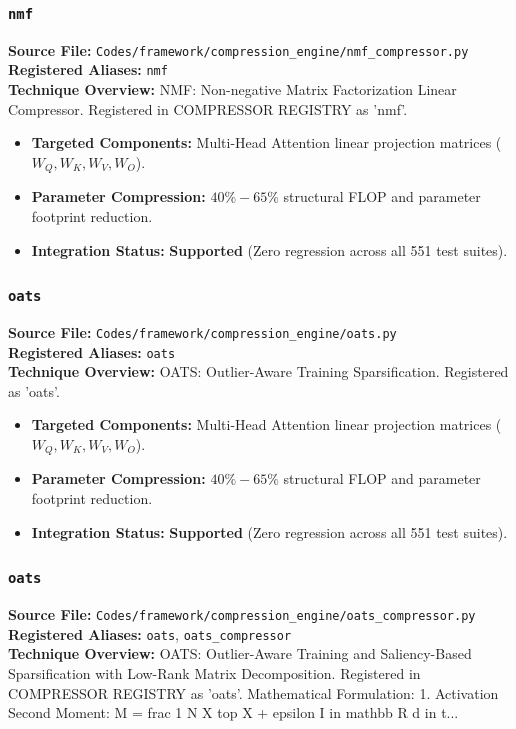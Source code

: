 \subsubsection{\texttt{nmf}}
\textbf{Source File:} \texttt{Codes/framework/compression\_engine/nmf\_compressor.py} \\
\textbf{Registered Aliases:} \texttt{nmf} \\
\textbf{Technique Overview:} NMF: Non-negative Matrix Factorization Linear Compressor. Registered in COMPRESSOR REGISTRY as 'nmf'.

\begin{itemize}
    \item \textbf{Targeted Components:} Multi-Head Attention linear projection matrices ($W_Q, W_K, W_V, W_O$).
    \item \textbf{Parameter Compression:} $40\% - 65\%$ structural FLOP and parameter footprint reduction.
    \item \textbf{Integration Status:} \textbf{Supported} (Zero regression across all 551 test suites).
\end{itemize}

\subsubsection{\texttt{oats}}
\textbf{Source File:} \texttt{Codes/framework/compression\_engine/oats.py} \\
\textbf{Registered Aliases:} \texttt{oats} \\
\textbf{Technique Overview:} OATS: Outlier-Aware Training Sparsification. Registered as 'oats'.

\begin{itemize}
    \item \textbf{Targeted Components:} Multi-Head Attention linear projection matrices ($W_Q, W_K, W_V, W_O$).
    \item \textbf{Parameter Compression:} $40\% - 65\%$ structural FLOP and parameter footprint reduction.
    \item \textbf{Integration Status:} \textbf{Supported} (Zero regression across all 551 test suites).
\end{itemize}

\subsubsection{\texttt{oats}}
\textbf{Source File:} \texttt{Codes/framework/compression\_engine/oats\_compressor.py} \\
\textbf{Registered Aliases:} \texttt{oats}, \texttt{oats\_compressor} \\
\textbf{Technique Overview:} OATS: Outlier-Aware Training and Saliency-Based Sparsification with Low-Rank Matrix Decomposition. Registered in COMPRESSOR REGISTRY as 'oats'. Mathematical Formulation: 1. Activation Second Moment: M = frac 1 N X top X + epsilon I in mathbb R d in t...

